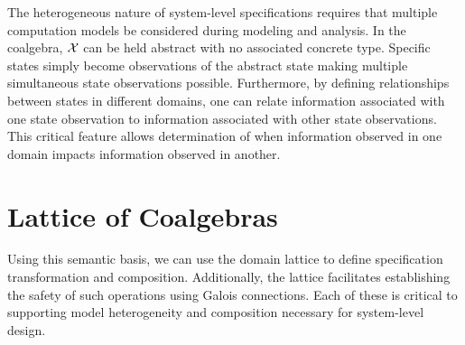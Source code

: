 \documentclass[12pt]{article}
\begin{document}

The heterogeneous nature of system-level specifications requires that multiple computation
models be considered during modeling and analysis.  In the coalgebra, $\mathcal X$ can be
held abstract with no associated concrete type.  Specific states simply become
observations of the abstract state making multiple simultaneous state observations
possible.  Furthermore, by defining relationships between states in different domains, one
can relate information associated with one state observation to information associated
with other state observations.  This critical feature allows determination of when
information observed in one domain impacts information observed in another.

\section{Lattice of Coalgebras}

Using this semantic basis, we can use the domain lattice to define specification
transformation and composition.  Additionally, the lattice facilitates establishing the
safety of such operations using Galois connections.  Each of these is critical to
supporting model heterogeneity and composition necessary for system-level design.


\end{document}
